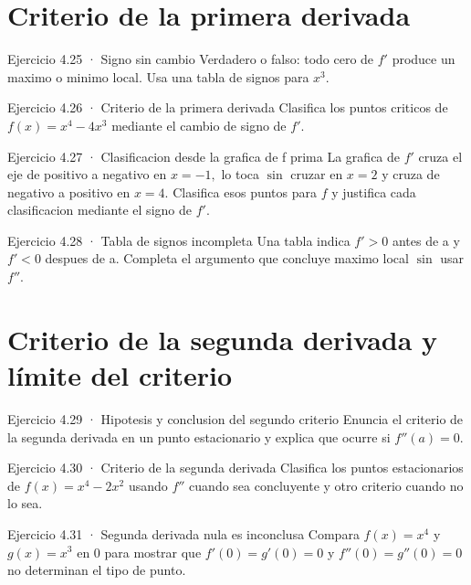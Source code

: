 \documentclass[10pt,a4paper,oneside,openany]{book}
\begin{document}
\section{Criterio de la primera derivada}
\begin{PSevenExerciseFixed}{Ejercicio 4.25 · Signo sin cambio}
Verdadero o falso: todo cero de \(f'\) produce un maximo o minimo local. Usa una tabla de signos para \(x^{3}\).
\end{PSevenExerciseFixed}
\begin{PSevenExerciseFixed}{Ejercicio 4.26 · Criterio de la primera derivada}
Clasifica los puntos criticos de \(f(x)=x^{4}-4x^{3}\) mediante el cambio de signo de \(f'\).
\end{PSevenExerciseFixed}
\begin{PSevenExerciseFixed}{Ejercicio 4.27 · Clasificacion desde la grafica de f prima}
La grafica de \(f'\) cruza el eje de positivo a negativo en \(x=-1,\) lo toca \(\sin\) cruzar en \(x=2\) y cruza de negativo a positivo en \(x=4\). Clasifica esos puntos para \(f\) y justifica cada clasificacion mediante el signo de \(f'\).
\end{PSevenExerciseFixed}
\begin{PSevenExerciseFixed}{Ejercicio 4.28 · Tabla de signos incompleta}
Una tabla indica \(f'>0\) antes de a y \(f'<0\) despues de a. Completa el argumento que concluye maximo local \(\sin\) usar \(f''\).
\end{PSevenExerciseFixed}
\section{Criterio de la segunda derivada y límite del criterio}
\begin{PSevenExerciseFixed}{Ejercicio 4.29 · Hipotesis y conclusion del segundo criterio}
Enuncia el criterio de la segunda derivada en un punto estacionario y explica que ocurre si \(f''(a)=0\).
\end{PSevenExerciseFixed}
\begin{PSevenExerciseFixed}{Ejercicio 4.30 · Criterio de la segunda derivada}
Clasifica los puntos estacionarios de \(f(x)=x^{4}-2x^{2}\) usando \(f''\) cuando sea concluyente y otro criterio cuando no lo sea.
\end{PSevenExerciseFixed}
\begin{PSevenExerciseFixed}{Ejercicio 4.31 · Segunda derivada nula es inconclusa}
Compara \(f(x)=x^{4}\) y \(g(x)=x^{3}\) en \(0\) para mostrar que \(f'(0)=g'(0)=0\) y \(f''(0)=g''(0)=0\) no determinan el tipo de punto.
\end{PSevenExerciseFixed}
\end{document}
